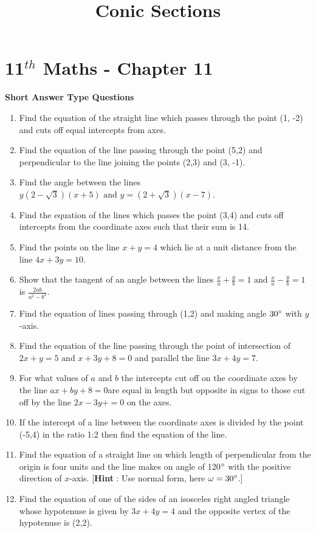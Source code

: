 \documentclass[12pt]{article}
\begin{document}
\begin{center}
\enlargethispage{-4cm}
\title{\textbf{Conic Sections}}
\date{\vspace{-5ex}} %
\maketitle
\end{center}
\setcounter{page}{1}
\section*{11$^{th}$ Maths - Chapter 11}
\textbf{Short Answer Type Questions}
\begin{enumerate}
\item Find the equation of the straight line which passes through the point (1, -2) and cuts off equal intercepts from axes.
\item Find the equation of the line passing through the point (5,2) and perpendicular to the line joining the points (2,3) and (3, -1).
\item Find the angle between the lines $y(2-\sqrt{3})(x+5)\text{ and }y=(2+\sqrt{3})(x-7)$.
\item Find the equation of the lines which passes the point (3,4) and cuts off intercepts from the coordinate axes such that their sum is 14.
\item Find the points on the line $x+y=4$ which lie at a unit distance from the line $4x+3y=10$.
\item Show that the tangent of an angle between the lines $\frac{x}{a}+\frac{y}{b}=1 \text{ and }\frac{x}{a}-\frac{y}{b}=1$ is $\frac{2ab}{a^2-b^2}$.
\item Find the equation of lines passing through (1,2) and making angle $30\degree$ with $y$-axis.
\item Find the equation of the line passing through the point of intersection of $2x+y=5\text{ and }x+3y+8=0$ and parallel the line $3x+4y=7$.
\item For what values of $a$ and $b$ the intercepts cut off on the coordinate axes by the line $ax+by+8=0$are equal in length but opposite in signs to those cut off by the line $2x-3y+=0$ on the axes.
\item If the intercept of a line between the coordinate axes is divided by the point (-5,4) in the ratio 1:2 then find the equation of the line.
\item Find the equation of a straight line on which length of perpendicular from the origin is four units and the line makes on angle of 120$\degree$ with the positive direction of $x$-axis. [\textbf{Hint} : Use normal form, here $\omega =30\degree$.]
\item Find the equation of one of the sides of an isosceles right angled triangle whose hypotenuse is given by $3x+4y=4$ and the opposite vertex of the hypotenuse is (2,2).
\end{enumerate}
\end{document}
